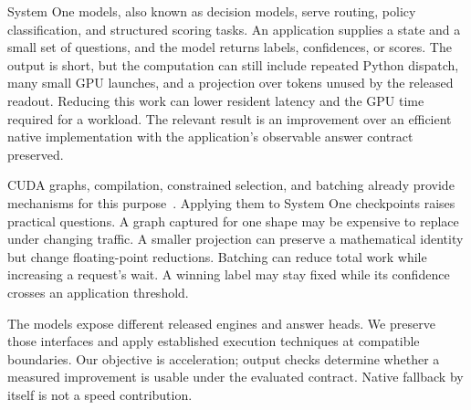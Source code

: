 \documentclass[10pt,twocolumn]{article}
\begin{document}
\begin{table}[t]
\centering\small
\setlength{\tabcolsep}{3pt}

\caption{Four-model overview of strengthened and released native comparisons. Native/DFIP divides resident latency or trace completion time by its DFIP counterpart; above one favors DFIP. Decider, Clef, and Liquid use paired container medians and 95\% bootstrap intervals. GLiNER uses a diverse resident trace in one worker without an independent-worker interval. The rows use different workloads and are not a ranking or pooled estimate. Serving and answer-fidelity limits are evaluated separately.}
\label{tab:overview}
\end{table}

System One models, also known as decision models, serve routing, policy classification, and structured scoring tasks. An application supplies a state and a small set of questions, and the model returns labels, confidences, or scores. The output is short, but the computation can still include repeated Python dispatch, many small GPU launches, and a projection over tokens unused by the released readout. Reducing this work can lower resident latency and the GPU time required for a workload. The relevant result is an improvement over an efficient native implementation with the application's observable answer contract preserved.

CUDA graphs, compilation, constrained selection, and batching already provide mechanisms for this purpose~\citep{cudagraphs,pygraph,sglang,vllm}. Applying them to System One checkpoints raises practical questions. A graph captured for one shape may be expensive to replace under changing traffic. A smaller projection can preserve a mathematical identity but change floating-point reductions. Batching can reduce total work while increasing a request's wait. A winning label may stay fixed while its confidence crosses an application threshold.

The models expose different released engines and answer heads. We preserve those interfaces and apply established execution techniques at compatible boundaries. Our objective is acceleration; output checks determine whether a measured improvement is usable under the evaluated contract. Native fallback by itself is not a speed contribution.
\end{document}
